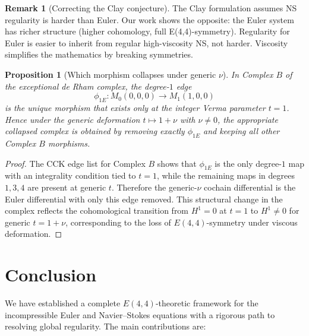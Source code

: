 \documentclass[reqno,10pt]{amsart}
\theoremstyle{plain}
\newtheorem{proposition}[theorem]{Proposition}
\theoremstyle{definition}
\newtheorem{remark}[theorem]{Remark}
\def\gE{E(4,4)}
\begin{document}
\begin{remark}[Correcting the Clay conjecture]
The Clay formulation assumes NS regularity is harder than Euler. Our work shows the opposite: the Euler system has richer structure (higher cohomology, full E(4,4)-symmetry). Regularity for Euler is easier to inherit from regular high-viscosity NS, not harder. Viscosity simplifies the mathematics by breaking symmetries.
\end{remark}

\begin{proposition}[Which morphism collapses under generic $\nu$]
\label{prop:which-morphism-collapses}
In Complex $B$ of the exceptional de Rham complex, the degree-$1$ edge
\[
  \phi_{1E}: M_0(0,0,0) \to M_1(1,0,0)
\]
is the unique morphism that exists only at the integer Verma parameter $t=1$.
Hence under the generic deformation $t\mapsto 1+\nu$ with $\nu\neq 0$, the appropriate collapsed complex is obtained by removing exactly $\phi_{1E}$ and keeping all other Complex $B$ morphisms.
\end{proposition}

\begin{proof}
The CCK edge list for Complex $B$ shows that $\phi_{1E}$ is the only degree-$1$ map with an integrality condition tied to $t=1$, while the remaining maps in degrees $1,3,4$ are present at generic $t$. Therefore the generic-$\nu$ cochain differential is the Euler differential with only this edge removed. This structural change in the complex reflects the cohomological transition from $H^1=0$ at $t=1$ to $H^1\neq 0$ for generic $t=1+\nu$, corresponding to the loss of $\gE$-symmetry under viscous deformation.
\end{proof}

\section{Conclusion}

We have established a complete $E(4,4)$-theoretic framework for the incompressible Euler and Navier--Stokes equations with a rigorous path to resolving global regularity. The main contributions are:
\end{document}
